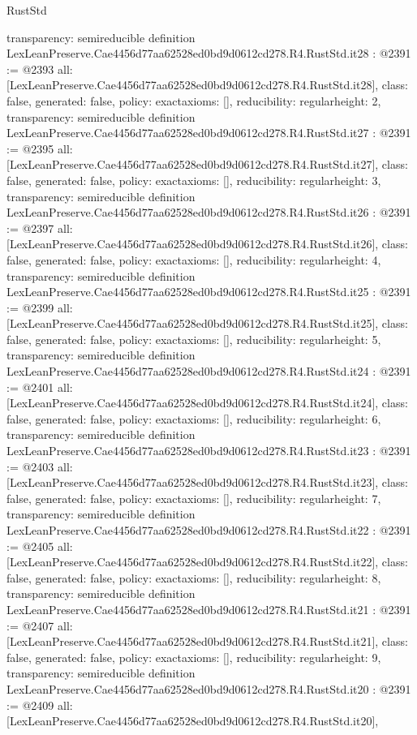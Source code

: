 \begin{lexlean}{RustStd}
\begin{coremodule}
{  transparency: semireducible
}
definition LexLeanPreserve.Cae4456d77aa62528ed0bd9d0612cd278.R4.RustStd.it28 : @2391 := @2393 {
  all: [LexLeanPreserve.Cae4456d77aa62528ed0bd9d0612cd278.R4.RustStd.it28],
  class: false,
  generated: false,
  policy: exact{axioms: []},
  reducibility: regular{height: 2},
  transparency: semireducible
}
definition LexLeanPreserve.Cae4456d77aa62528ed0bd9d0612cd278.R4.RustStd.it27 : @2391 := @2395 {
  all: [LexLeanPreserve.Cae4456d77aa62528ed0bd9d0612cd278.R4.RustStd.it27],
  class: false,
  generated: false,
  policy: exact{axioms: []},
  reducibility: regular{height: 3},
  transparency: semireducible
}
definition LexLeanPreserve.Cae4456d77aa62528ed0bd9d0612cd278.R4.RustStd.it26 : @2391 := @2397 {
  all: [LexLeanPreserve.Cae4456d77aa62528ed0bd9d0612cd278.R4.RustStd.it26],
  class: false,
  generated: false,
  policy: exact{axioms: []},
  reducibility: regular{height: 4},
  transparency: semireducible
}
definition LexLeanPreserve.Cae4456d77aa62528ed0bd9d0612cd278.R4.RustStd.it25 : @2391 := @2399 {
  all: [LexLeanPreserve.Cae4456d77aa62528ed0bd9d0612cd278.R4.RustStd.it25],
  class: false,
  generated: false,
  policy: exact{axioms: []},
  reducibility: regular{height: 5},
  transparency: semireducible
}
definition LexLeanPreserve.Cae4456d77aa62528ed0bd9d0612cd278.R4.RustStd.it24 : @2391 := @2401 {
  all: [LexLeanPreserve.Cae4456d77aa62528ed0bd9d0612cd278.R4.RustStd.it24],
  class: false,
  generated: false,
  policy: exact{axioms: []},
  reducibility: regular{height: 6},
  transparency: semireducible
}
definition LexLeanPreserve.Cae4456d77aa62528ed0bd9d0612cd278.R4.RustStd.it23 : @2391 := @2403 {
  all: [LexLeanPreserve.Cae4456d77aa62528ed0bd9d0612cd278.R4.RustStd.it23],
  class: false,
  generated: false,
  policy: exact{axioms: []},
  reducibility: regular{height: 7},
  transparency: semireducible
}
definition LexLeanPreserve.Cae4456d77aa62528ed0bd9d0612cd278.R4.RustStd.it22 : @2391 := @2405 {
  all: [LexLeanPreserve.Cae4456d77aa62528ed0bd9d0612cd278.R4.RustStd.it22],
  class: false,
  generated: false,
  policy: exact{axioms: []},
  reducibility: regular{height: 8},
  transparency: semireducible
}
definition LexLeanPreserve.Cae4456d77aa62528ed0bd9d0612cd278.R4.RustStd.it21 : @2391 := @2407 {
  all: [LexLeanPreserve.Cae4456d77aa62528ed0bd9d0612cd278.R4.RustStd.it21],
  class: false,
  generated: false,
  policy: exact{axioms: []},
  reducibility: regular{height: 9},
  transparency: semireducible
}
definition LexLeanPreserve.Cae4456d77aa62528ed0bd9d0612cd278.R4.RustStd.it20 : @2391 := @2409 {
  all: [LexLeanPreserve.Cae4456d77aa62528ed0bd9d0612cd278.R4.RustStd.it20],
}
\end{coremodule}
\end{lexlean}
